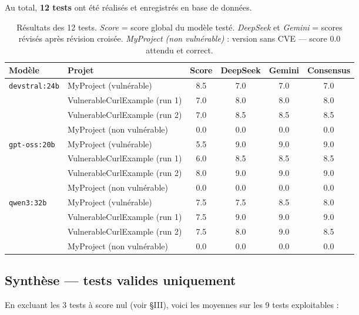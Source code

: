\documentclass[a4paper, 12pt, hidelinks]{article}
\begin{document}
Au total, \textbf{12 tests} ont été réalisés et enregistrés en base de données.

\begin{table}[H]
  \centering
  \small
  \begin{tabular}{l l c c c c}
    \toprule
    \textbf{Modèle} & \textbf{Projet} & \textbf{Score} & \textbf{DeepSeek} & \textbf{Gemini} & \textbf{Consensus} \\
    \midrule
    \multirow{4}{*}{\texttt{devstral:24b}}
      & MyProject (vulnérable)        & 8.5 & 7.0 & 7.0 & 7.0 \\
      & VulnerableCurlExample (run 1) & 7.0 & 8.0 & 8.0 & 8.0 \\
      & VulnerableCurlExample (run 2) & 7.0 & 8.5 & 8.5 & 8.5 \\
      & MyProject (non vulnérable)    & 0.0 & 0.0 & 0.0 & 0.0 \\
    \midrule
    \multirow{4}{*}{\texttt{gpt-oss:20b}}
      & MyProject (vulnérable)        & 5.5 & 9.0 & 9.0 & 9.0 \\
      & VulnerableCurlExample (run 1) & 6.0 & 8.5 & 8.5 & 8.5 \\
      & VulnerableCurlExample (run 2) & 8.0 & 9.0 & 9.0 & 9.0 \\
      & MyProject (non vulnérable)    & 0.0 & 0.0 & 0.0 & 0.0 \\
    \midrule
    \multirow{4}{*}{\texttt{qwen3:32b}}
      & MyProject (vulnérable)        & 7.5 & 7.5 & 8.5 & 8.0 \\
      & VulnerableCurlExample (run 1) & 7.5 & 9.0 & 9.0 & 9.0 \\
      & VulnerableCurlExample (run 2) & 7.5 & 8.0 & 9.0 & 8.5 \\
      & MyProject (non vulnérable)    & 0.0 & 0.0 & 0.0 & 0.0 \\
    \bottomrule
  \end{tabular}
  \caption{Résultats des 12 tests. \textit{Score} = score global du modèle testé. \textit{DeepSeek} et \textit{Gemini} = scores révisés après révision croisée. \textit{MyProject (non vulnérable)} : version sans CVE — score 0.0 attendu et correct.}
\end{table}

\subsection*{Synthèse — tests valides uniquement}

En excluant les 3 tests à score nul (voir §III), voici les moyennes sur les 9 tests exploitables :
\end{document}
